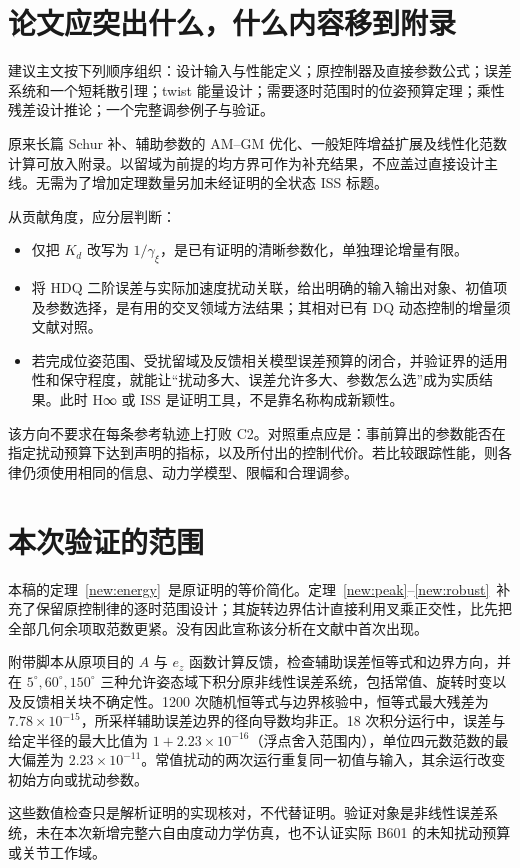 \section{论文应突出什么，什么内容移到附录}

建议主文按下列顺序组织：设计输入与性能定义；原控制器及直接参数公式；误差系统和一个短耗散引理；twist 能量设计；需要逐时范围时的位姿预算定理；乘性残差设计推论；一个完整调参例子与验证。

原来长篇 Schur 补、辅助参数的 AM--GM 优化、一般矩阵增益扩展及线性化范数计算可放入附录。以留域为前提的均方界可作为补充结果，不应盖过直接设计主线。无需为了增加定理数量另加未经证明的全状态 ISS 标题。

从贡献角度，应分层判断：
\begin{itemize}[leftmargin=2em]
\item 仅把 $K_d$ 改写为 $1/\gamma_\xi$，是已有证明的清晰参数化，单独理论增量有限。
\item 将 HDQ 二阶误差与实际加速度扰动关联，给出明确的输入输出对象、初值项及参数选择，是有用的交叉领域方法结果；其相对已有 DQ 动态控制的增量须文献对照。
\item 若完成位姿范围、受扰留域及反馈相关模型误差预算的闭合，并验证界的适用性和保守程度，就能让“扰动多大、误差允许多大、参数怎么选”成为实质结果。此时 H∞ 或 ISS 是证明工具，不是靠名称构成新颖性。
\end{itemize}

该方向不要求在每条参考轨迹上打败 C2。对照重点应是：事前算出的参数能否在指定扰动预算下达到声明的指标，以及所付出的控制代价。若比较跟踪性能，则各律仍须使用相同的信息、动力学模型、限幅和合理调参。

\section{本次验证的范围}

本稿的定理~\ref{new:energy}~是原证明的等价简化。定理~\ref{new:peak}--\ref{new:robust}~补充了保留原控制律的逐时范围设计；其旋转边界估计直接利用叉乘正交性，比先把全部几何余项取范数更紧。没有因此宣称该分析在文献中首次出现。

附带脚本从原项目的 $A$ 与 $e_z$ 函数计算反馈，检查辅助误差恒等式和边界方向，并在 $5^\circ,60^\circ,150^\circ$ 三种允许姿态域下积分原非线性误差系统，包括常值、旋转时变以及反馈相关块不确定性。1200 次随机恒等式与边界核验中，恒等式最大残差为 $7.78\times10^{-15}$，所采样辅助误差边界的径向导数均非正。18 次积分运行中，误差与给定半径的最大比值为 $1+2.23\times10^{-16}$（浮点舍入范围内），单位四元数范数的最大偏差为 $2.23\times10^{-11}$。常值扰动的两次运行重复同一初值与输入，其余运行改变初始方向或扰动参数。

这些数值检查只是解析证明的实现核对，不代替证明。验证对象是非线性误差系统，未在本次新增完整六自由度动力学仿真，也不认证实际 B601 的未知扰动预算或关节工作域。
